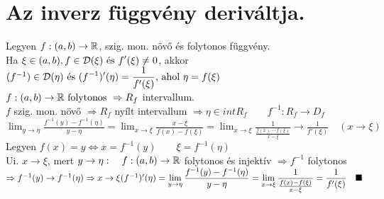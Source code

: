 \documentclass[a4paper,12pt]{article}
\begin{document}
\section{Az inverz függvény deriváltja.}
\tetel Legyen $f:(a,b)\to\mathbb{R}$, szig. mon. növő és folytonos függvény.\\[0.1cm]Ha $\xi\in(a,b),f\in\displaystyle\mathcal{D}(\xi) \text{ és }f'(\xi)\neq0$, akkor\\[0.1cm] $(f^{-1})\in\displaystyle\mathcal{D}(\eta)\text{ és }(f^{-1})'(\eta)=\frac{1}{f'(\xi)}\text{, ahol }\eta=f(\xi)$\\[0.2cm]\biz $f:(a,b)\to\mathbb{R}\text{ folytonos }\Rightarrow R_f$ intervallum.\\[0.2cm] $f$ szig. mon. növő $\Rightarrow R_f$ nyílt intervallum $\Rightarrow\eta\in int R_f\quad\quad f^{-1}:R_f\to D_f$\\[0.2cm] $\displaystyle\lim_{y\to\eta}\frac{f^{-1}(y)-f^{-1}(\eta)}{y-\eta}=\displaystyle\lim_{x\to\xi}\frac{x-\xi}{f(x)-f(\xi)}=\displaystyle\lim_{x\to\xi}\frac{1}{\frac{f(x)-f(\xi)}{x-\xi}}\longrightarrow\frac{1}{f'(\xi)}\quad(x\to\xi)$\\[0.2cm] Legyen $f(x)=y\Leftrightarrow x=f^{-1}(y)\quad\quad\xi=f^{-1}(\eta)$\\[0.2cm] Ui. $x\to\xi$, mert $y\to\eta:\quad f:(a,b)\to\mathbb{R}$ folytonos és injektív $\Rightarrow f^{-1}$ folytonos $\Rightarrow f^{-1}(y)\to f^{-1}(\eta)\\[0.1cm]\Rightarrow x\to\xi\\[0.2cm](f^{-1})'(\eta)=\displaystyle\lim_{y\to\eta}\frac{f^{-1}(y)-f^{-1}(\eta)}{y-\eta}=\displaystyle\lim_{x\to\xi}\frac{1}{\frac{f(x)-f(\xi)}{x-\xi}}= \frac{1}{f'(\xi)}\quad\blacksquare$
\end{document}
